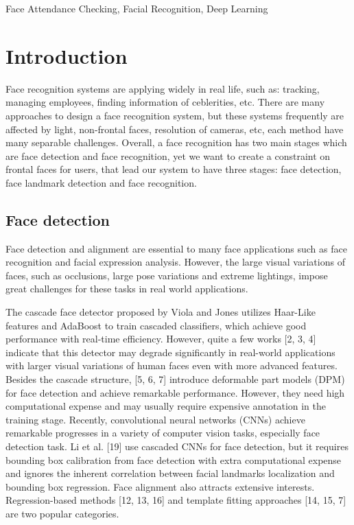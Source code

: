 \documentclass[journal, twocolumn]{IEEEtran}
\begin{document}
\begin{IEEEkeywords}
Face Attendance Checking, Facial Recognition, Deep Learning
\end{IEEEkeywords}


\IEEEpeerreviewmaketitle


\section{Introduction}
\label{introduction}

Face recognition systems are applying widely in real life, such as: tracking, managing employees, finding information of ceblerities, etc. There are many approaches to design a face recognition system, but these systems frequently are affected by light, non-frontal faces, resolution of cameras, etc, each method have many separable challenges. Overall, a face recognition has two main stages which are face detection and face recognition, yet we want to create a constraint on frontal faces for users, that lead our system to have three stages: face detection, face landmark detection and face recognition.  
\subsection{Face detection}
Face detection and alignment are essential to many face applications such as face recognition and facial expression analysis. However, the large visual variations of faces, such as occlusions, large pose variations and extreme lightings, impose
great challenges for these tasks in real world applications.

The cascade face detector proposed by Viola and Jones \cite{ref:detect-1} utilizes Haar-Like features and AdaBoost to train cascaded classifiers, which achieve good performance with real-time
efficiency. However, quite a few works [2, 3, 4] indicate that this detector may degrade significantly in real-world applications with larger visual variations of human faces even with more advanced features. Besides the cascade structure, [5, 6, 7] introduce deformable part models (DPM) for face detection and achieve remarkable performance. However, they need high computational expense and may usually require expensive annotation in the training stage. Recently, convolutional neural networks (CNNs) achieve remarkable progresses in a variety of computer vision tasks, especially face detection task. Li et al. [19] use cascaded CNNs for face detection, but it requires bounding box calibration from face detection with extra computational expense and ignores the inherent correlation between facial landmarks localization and bounding box regression. Face alignment also attracts extensive interests. Regression-based methods [12, 13, 16] and template fitting approaches [14, 15, 7] are two popular categories.
\end{document}
